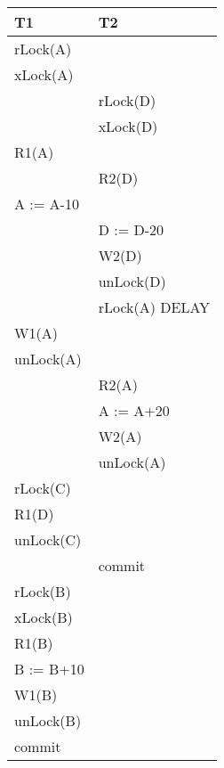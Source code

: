 \documentclass{bschlangaul-aufgabe}
\begin{document}
\begin{enumerate}
\begin{liAntwort}
\begin{tabular}{|l|l|}
\hline
T1             & T2                 \\\hline
rLock(A)       &                    \\
xLock(A)       &                    \\
               & rLock(D)           \\
               & xLock(D)           \\
R1(A)          &                    \\
               & R2(D)              \\
A := A-10      &                    \\
               & D := D-20          \\
               & W2(D)              \\
               & unLock(D)          \\
               & rLock(A) DELAY     \\
W1(A)          &                    \\
unLock(A)      &                    \\
               & R2(A)              \\
               & A := A+20          \\
               & W2(A)              \\
               & unLock(A)          \\
rLock(C)       &                    \\
R1(D)          &                    \\
unLock(C)      &                    \\
               & commit             \\
rLock(B)       &                    \\
xLock(B)       &                    \\
R1(B)          &                    \\
B := B+10      &                    \\
W1(B)          &                    \\
unLock(B)      &                    \\
commit         &                    \\
\hline
\end{tabular}

\end{liAntwort}

\end{enumerate}
\end{document}
